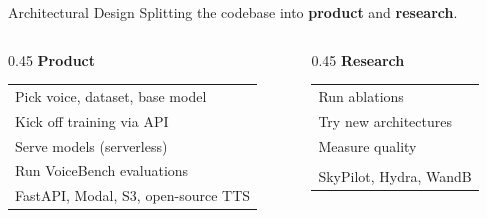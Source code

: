 \documentclass[aspectratio=169]{beamer}
\begin{document}
\begin{frame}{Architectural Design}
\centering
Splitting the codebase into \textbf{product} and \textbf{research}.

\vspace{1.5em}
\begin{columns}[T]
\begin{column}{0.45\textwidth}
\centering
\textbf{Product}

\vspace{0.5em}
\begin{tabular}{l}
\toprule
Pick voice, dataset, base model \\
Kick off training via API \\
Serve models (serverless) \\
Run VoiceBench evaluations \\
\midrule
FastAPI, Modal, S3, open-source TTS \\
\bottomrule
\end{tabular}
\end{column}

\begin{column}{0.45\textwidth}
\centering
\textbf{Research}

\vspace{0.5em}
\begin{tabular}{l}
\toprule
Run ablations \\
Try new architectures \\
Measure quality \\
\\
\midrule
SkyPilot, Hydra, WandB \\
\bottomrule
\end{tabular}
\end{column}
\end{columns}
\end{frame}
\end{document}
